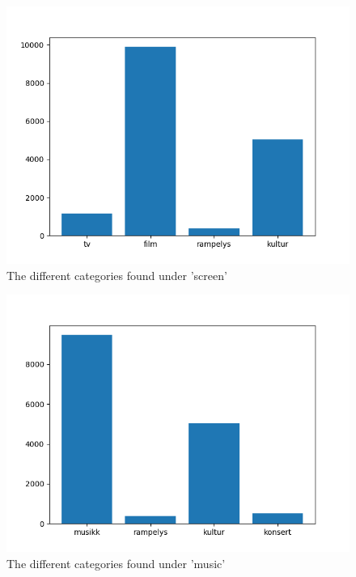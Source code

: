 \documentclass{report}
\begin{document}
\begin{figure}[h!]
		\centering
		\includegraphics[scale=0.5]{img/screen_categories}
		\caption{The different categories found under 'screen'}
		\label{fig:screen}
\end{figure}%
\begin{figure}[h!]
	\centering
	\includegraphics[scale=0.5]{img/music_categories}
	\caption{The different categories found under 'music'}
	\label{fig:music}
\end{figure}%
\end{document}
